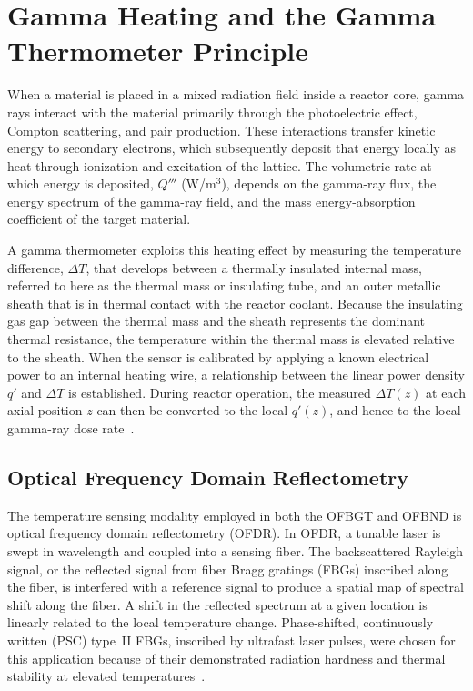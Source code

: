 \section{Gamma Heating and the Gamma Thermometer Principle}
\label{sec:gamma_heating}

When a material is placed in a mixed radiation field inside a reactor core, gamma rays interact with the material primarily through the photoelectric effect, Compton scattering, and pair production.  These interactions transfer kinetic energy to secondary electrons, which subsequently deposit that energy locally as heat through ionization and excitation of the lattice.  The volumetric rate at which energy is deposited, $Q'''$ (W/m$^3$), depends on the gamma-ray flux, the energy spectrum of the gamma-ray field, and the mass energy-absorption coefficient of the target material.

A gamma thermometer exploits this heating effect by measuring the temperature difference, $\Delta T$, that develops between a thermally insulated internal mass, referred to here as the thermal mass or insulating tube, and an outer metallic sheath that is in thermal contact with the reactor coolant.  Because the insulating gas gap between the thermal mass and the sheath represents the dominant thermal resistance, the temperature within the thermal mass is elevated relative to the sheath.  When the sensor is calibrated by applying a known electrical power to an internal heating wire, a relationship between the linear power density $q'$ and $\Delta T$ is established.  During reactor operation, the measured $\Delta T(z)$ at each axial position $z$ can then be converted to the local $q'(z)$, and hence to the local gamma-ray dose rate~\cite{Birri2021Dissertation, Birri2020IEEE}.

\subsection{Optical Frequency Domain Reflectometry}

The temperature sensing modality employed in both the OFBGT and OFBND is optical frequency domain reflectometry (OFDR).  In OFDR, a tunable laser is swept in wavelength and coupled into a sensing fiber.  The backscattered Rayleigh signal, or the reflected signal from fiber Bragg gratings (FBGs) inscribed along the fiber, is interfered with a reference signal to produce a spatial map of spectral shift along the fiber.  A shift in the reflected spectrum at a given location is linearly related to the local temperature change.  Phase-shifted, continuously written (PSC) type~II FBGs, inscribed by ultrafast laser pulses, were chosen for this application because of their demonstrated radiation hardness and thermal stability at elevated temperatures~\cite{Birri2021Dissertation}.

